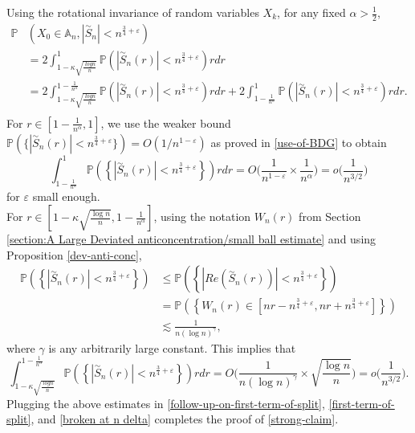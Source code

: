 \documentclass[9pt,a4paper,reqno]{amsart}
\newcommand{\tildea}[1]{\overset{\sim}{#1}}
\theoremstyle{mine}
\theoremstyle{definition}
\theoremstyle{remark}
\renewcommand\epsilon{\varepsilon}
\newcommand{\mb}{\mathbb}
\begin{document}
Using the rotational invariance of random variables $X_k$, for any fixed $\alpha> \frac{1}{2}$,
\begin{align}\label{follow-up-on-first-term-of-split}
 \mathbb{P} &\left(X_0 \in \mb{A}_n,| \tildea{S}_n| < n^{\frac{3}{4}+ \epsilon}\right) \\ &= 2\int_{1 - \kappa \sqrt{\frac{\ logn}{n}}}^1\mathbb{P} \left(| \tildea{S}_n(r)| < n^{\frac{3}{4}+ \epsilon}\right) r dr\nonumber \\ & = 2\int_{1 - \kappa \sqrt{\frac{\ logn}{n}}}^{1 -\frac{1}{n^\alpha}}\mathbb{P} \left(| \tildea{S}_n(r)| < n^{\frac{3}{4}+ \epsilon} \right) r dr + 2\int_{1 -\frac{1}{n^\alpha}}^1\mathbb{P} \left(| \tildea{S}_n(r)| < n^{\frac{3}{4}+ \epsilon} \right) r dr. \nonumber\\ \nonumber
      \end{align} 
 For $r\in [1 - \frac{1}{n^\alpha}, 1]$, we use the weaker bound $\mathbb{P} (\{| \tildea{S}_n(r)| < n^{\frac{3}{4}+ \epsilon} \}) = O(1/n^{1-\epsilon})$ as proved in \eqref{use-of-BDG} to obtain 
 \[  \int_{1 -\frac{1}{n^\alpha}}^1\mathbb{P} \left(\left\{| \tildea{S}_n(r)| < n^{\frac{3}{4}+ \epsilon} \right \}\right) r dr = O\biggl(\frac{1}{n^{1-\epsilon}} \times \frac{1}{n^{\alpha}}\biggr) = o\biggl(\frac{1}{n^{{3/2}}}\biggr)\]
 for $\epsilon$ small enough. \\
For $r\in [1 - \kappa \sqrt{\frac{\log n}{n}}, 1- \frac{1}{n^{\alpha}}]$, using the notation $W_n(r)$ from Section \ref{section:A Large Deviated anticoncentration/small ball estimate} and using Proposition \ref{dev-anti-conc},
\begin{align}\label{we-get-only-log-bound}
    \mathbb{P} \left(\left\{| \tildea{S}_n(r)| < n^{\frac{3}{4}+ \epsilon} \right \}\right) & \leq  \mathbb{P} \left(\left\{| Re(\tildea{S}_n(r))| < n^{\frac{3}{4}+ \epsilon} \right \}\right) \\ & =  \mathbb{P} \left(\left\{ W_n(r) \in [nr - n^{\frac{3}{4} + \epsilon}, nr + n^{\frac{3}{4} + \epsilon}]\right \}\right) \nonumber\\ & \lesssim \frac{1}{n (\log n)^\gamma},\nonumber
\end{align}
where $\gamma$ is any arbitrarily large constant. This implies that 
\begin{equation} \label{marginally-better}
\int_{1 - \kappa \sqrt{\frac{\ logn}{n}}}^{1 -\frac{1}{n^\alpha}}\mathbb{P} \left(\left\{| \tildea{S}_n(r)| < n^{\frac{3}{4}+ \epsilon} \right \}\right) r dr = O\biggl( \frac{1}{n (\log n)^\gamma} \times\sqrt{\frac{\log n }{ n}}\biggr)  = o\biggl(\frac{1}{n^{3/2}}\biggr).
\end{equation}
Plugging the above estimates in \eqref{follow-up-on-first-term-of-split}, \eqref{first-term-of-split}, and \eqref{broken at n delta} completes the proof of \eqref{strong-claim}.
\end{document}
